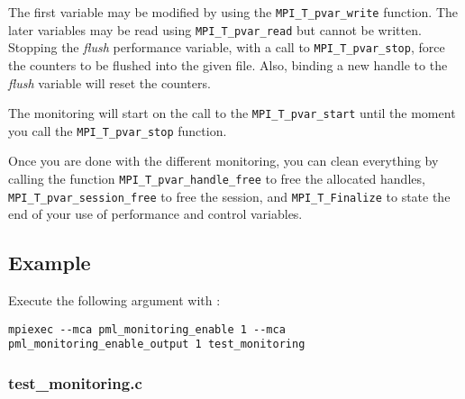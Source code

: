 \documentclass[notitlepage]{article}
\begin{document}
The first variable may be modified by using the
\texttt{MPI\_T\_pvar\_write} function. The later variables may be read
using \texttt{MPI\_T\_pvar\_read} but cannot be written. Stopping the
\textit{flush} performance variable, with a call to
\texttt{MPI\_T\_pvar\_stop}, force the counters to be flushed into the
given file. Also, binding a new handle to the \textit{flush} variable
will reset the counters.

The monitoring will start on the call to the
\texttt{MPI\_T\_pvar\_start} until the moment you call the
\texttt{MPI\_T\_pvar\_stop} function.

Once you are done with the different monitoring, you can clean
everything by calling the function \texttt{MPI\_T\_pvar\_handle\_free}
to free the allocated handles, \texttt{MPI\_T\_pvar\_session\_free} to
free the session, and \texttt{MPI\_T\_Finalize} to state the end of
your use of performance and control variables.

\subsection{Example}

Execute the following argument with :
\begin{verbatim}
mpiexec --mca pml_monitoring_enable 1 --mca pml_monitoring_enable_output 1 test_monitoring
\end{verbatim}

\subsubsection{test\_monitoring.c}
\end{document}
